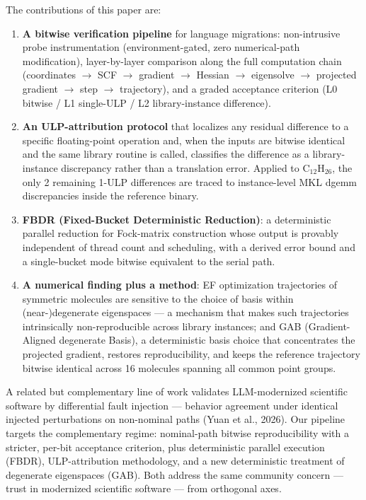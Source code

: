 \documentclass[preprint,12pt]{elsarticle}
\begin{document}
The contributions of this paper are:
\begin{enumerate}
\item \textbf{A bitwise verification pipeline} for language migrations: non-intrusive probe instrumentation (environment-gated, zero numerical-path modification), layer-by-layer comparison along the full computation chain (coordinates $\to$ SCF $\to$ gradient $\to$ Hessian $\to$ eigensolve $\to$ projected gradient $\to$ step $\to$ trajectory), and a graded acceptance criterion (L0 bitwise / L1 single-ULP / L2 library-instance difference).
\item \textbf{An ULP-attribution protocol} that localizes any residual difference to a specific floating-point operation and, when the inputs are bitwise identical and the same library routine is called, classifies the difference as a library-instance discrepancy rather than a translation error. Applied to C$_{12}$H$_{26}$, the only 2 remaining 1-ULP differences are traced to instance-level MKL dgemm discrepancies inside the reference binary.
\item \textbf{FBDR (Fixed-Bucket Deterministic Reduction)}: a deterministic parallel reduction for Fock-matrix construction whose output is provably independent of thread count and scheduling, with a derived error bound and a single-bucket mode bitwise equivalent to the serial path.
\item \textbf{A numerical finding plus a method}: EF optimization trajectories of symmetric molecules are sensitive to the choice of basis within (near-)degenerate eigenspaces --- a mechanism that makes such trajectories intrinsically non-reproducible across library instances; and GAB (Gradient-Aligned degenerate Basis), a deterministic basis choice that concentrates the projected gradient, restores reproducibility, and keeps the reference trajectory bitwise identical across 16 molecules spanning all common point groups.
\end{enumerate}

A related but complementary line of work validates LLM-modernized scientific software by differential fault injection --- behavior agreement under identical injected perturbations on non-nominal paths (Yuan et al., 2026). Our pipeline targets the complementary regime: nominal-path bitwise reproducibility with a stricter, per-bit acceptance criterion, plus deterministic parallel execution (FBDR), ULP-attribution methodology, and a new deterministic treatment of degenerate eigenspaces (GAB). Both address the same community concern --- trust in modernized scientific software --- from orthogonal axes.
\end{document}
